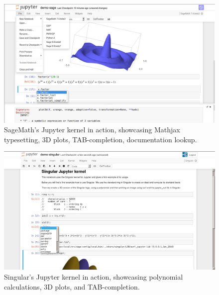 \documentclass{deliverablereport}
\begin{document}
\begin{figure}[ht]
  \includegraphics[width=140mm,trim={0 0 0 1px},clip]{sage.png}
  \caption{SageMath's Jupyter kernel in action, showcasing Mathjax
    typesetting, 3D plots, TAB-completion, documentation lookup.}
\end{figure}
\begin{figure}[ht]
  \includegraphics[width=140mm,trim={0 0 0 1px},clip]{singular.png}
  \caption{Singular's Jupyter kernel in action, showcasing polynomial
    calculations, 3D plots, and TAB-completion.}
\end{figure}
\clearpage
\end{document}
